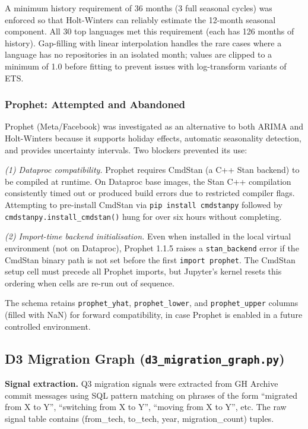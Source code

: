 \documentclass[conference]{IEEEtran}
\begin{document}
A minimum history requirement of 36 months (3 full seasonal cycles) was
enforced so that Holt-Winters can reliably estimate the 12-month seasonal
component. All 30 top languages met this requirement (each has 126 months
of history). Gap-filling with linear interpolation handles the rare cases
where a language has no repositories in an isolated month; values are
clipped to a minimum of 1.0 before fitting to prevent issues with
log-transform variants of ETS.

\subsubsection{Prophet: Attempted and Abandoned}

Prophet (Meta/Facebook) was investigated as an alternative to both ARIMA
and Holt-Winters because it supports holiday effects, automatic seasonality
detection, and provides uncertainty intervals. Two blockers prevented its
use:

\textit{(1) Dataproc compatibility.} Prophet requires CmdStan (a C++ Stan
backend) to be compiled at runtime. On Dataproc base images, the Stan C++
compilation consistently timed out or produced build errors due to restricted
compiler flags. Attempting to pre-install CmdStan via \texttt{pip install
cmdstanpy} followed by \texttt{cmdstanpy.install\_cmdstan()} hung for
over six hours without completing.

\textit{(2) Import-time backend initialisation.} Even when installed in the
local virtual environment (not on Dataproc), Prophet 1.1.5 raises a
\texttt{stan\_backend} error if the CmdStan binary path is not set before
the first \texttt{import prophet}. The CmdStan setup cell must precede all
Prophet imports, but Jupyter's kernel resets this ordering when cells are
re-run out of sequence.

The schema retains \texttt{prophet\_yhat}, \texttt{prophet\_lower}, and
\texttt{prophet\_upper} columns (filled with NaN) for forward compatibility,
in case Prophet is enabled in a future controlled environment.

\subsection{D3 Migration Graph (\texttt{d3\_migration\_graph.py})}

\textbf{Signal extraction.} Q3 migration signals were extracted from GH
Archive commit messages using SQL pattern matching on phrases of the form
``migrated from X to Y'', ``switching from X to Y'', ``moving from X to Y'',
etc. The raw signal table contains (from\_tech, to\_tech, year,
migration\_count) tuples.
\end{document}
